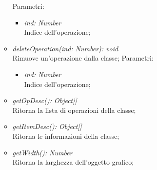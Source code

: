 \documentclass[../DefinizioneDiProdotto.tex]{subfiles}
\begin{document}
\begin{itemize}
\begin{itemize}
					Parametri:
					\begin{itemize}
						\item \emph{ind: Number} \\
						Indice dell'operazione;
					\end{itemize}
					\item \emph{deleteOperation(ind: Number): void}\\
					Rimuove un'operazione dalla classe;
					Parametri:
					\begin{itemize}
						\item \emph{ind: Number} \\
						Indice dell'operazione;
					\end{itemize}
					\item \emph{getOpDesc(): Object[]}\\
					Ritorna la lista di operazioni della classe;
					\item \emph{getItemDesc(): Object[]}\\
					Ritorna le informazioni della classe;		
					\item \emph{getWidth(): Number}\\
					Ritorna la larghezza dell'oggetto grafico;	
				\end{itemize}
			\end{itemize}
			
\end{document}
